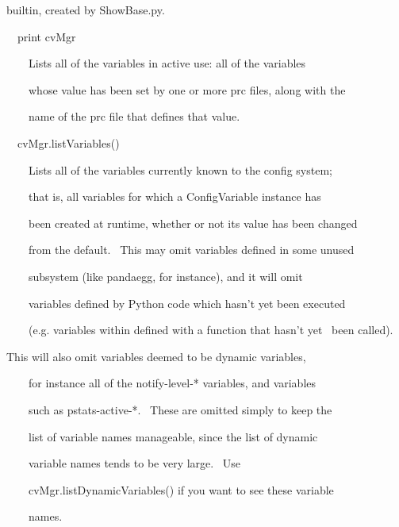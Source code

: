 \documentclass[a4paper]{article}
\begin{document}
{\color{black}
builtin, created by ShowBase.py.}


\bigskip

{\color{black}
\ \ print cvMgr}


\bigskip

{\color{black}
\ \ \ \ Lists all of the variables in active use: all of the variables}

{\color{black}
\ \ \ \ whose value has been set by one or more prc files, along with the}

{\color{black}
\ \ \ \ name of the prc file that defines that value.}


\bigskip

{\color{black}
\ \ cvMgr.listVariables()}


\bigskip

{\color{black}
\ \ \ \ Lists all of the variables currently known to the config system;}

{\color{black}
\ \ \ \ that is, all variables for which a ConfigVariable instance has}

{\color{black}
\ \ \ \ been created at runtime, whether or not its value has been changed}

{\color{black}
\ \ \ \ from the default. \ This may omit variables defined in some unused}

\clearpage
\bigskip

{\color{black}
\ \ \ \ subsystem (like pandaegg, for instance), and it will omit}

{\color{black}
\ \ \ \ variables defined by Python code which hasn't yet been executed}

{\color{black}
\ \ \ \ (e.g. variables within defined with a function that hasn't yet \ been called).}

{\color{black}
This will also omit variables deemed to be {\textquotedbl}dynamic{\textquotedbl} variables,}

{\color{black}
\ \ \ \ for instance all of the notify-level-* variables, and variables}

{\color{black}
\ \ \ \ such as pstats-active-*. \ These are omitted simply to keep the}

{\color{black}
\ \ \ \ list of variable names manageable, since the list of dynamic}

{\color{black}
\ \ \ \ variable names tends to be very large. \ Use}

{\color{black}
\ \ \ \ cvMgr.listDynamicVariables() if you want to see these variable}

{\color{black}
\ \ \ \ names.}
\end{document}
